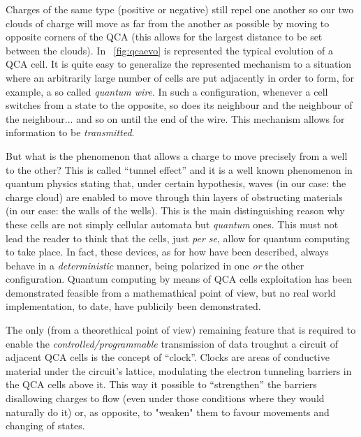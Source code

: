 Charges of the same type (positive or negative) still repel one another so our two clouds of charge will move as far from the another as possible by moving to opposite corners of the QCA (this allows for the largest distance to be set between the clouds). In \figurename~\ref{fig:qcaevo} is represented the typical evolution of a QCA cell. It is quite easy to generalize the represented mechanism to a situation where an arbitrarily large number of cells are put adjacently in order to form, for example, a so called \textsl{quantum wire}. In such a configuration, whenever a cell switches from a state to the opposite, so does its neighbour and the neighbour of the neighbour... and so on until the end of the wire. This mechanism allows for information to be \textsl{transmitted}.

But what is the phenomenon that allows a charge to move precisely from a well to the other? This is called ``tunnel effect'' and it is a well known phenomenon in quantum physics stating that, under certain hypothesis, waves (in our case: the charge cloud) are enabled to move through thin layers of obstructing materials (in our case: the walls of the wells). This is the main distinguishing reason why these cells are not simply cellular automata but \textsl{quantum} ones. This must not lead the reader to think that the cells, just \textsl{per se}, allow for quantum computing to take place. In fact, these devices, as for how have been described, always behave in a \textsl{deterministic} manner, being polarized in one \textsl{or} the other configuration. Quantum computing by means of QCA cells exploitation has been demonstrated feasible from a mathemathical point of view, but no real world implementation, to date, have publicily been demonstrated.  

The only (from a theorethical point of view) remaining feature that is required to enable the \textsl{controlled/programmable} transmission of data troughut a circuit of adjacent QCA cells is the concept of ``clock''. Clocks are areas of conductive material under the circuit's lattice, modulating the electron tunneling barriers in the QCA cells above it. This way it possible to ``strengthen'' the barriers disallowing charges to flow (even under those conditions where they would naturally do it) or, as opposite, to "weaken" them to favour movements and changing of states.

